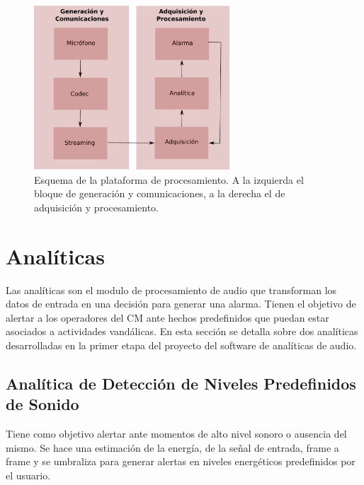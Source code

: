 \documentclass{article}
\begin{document}
\begin{figure}[h]
\begin{center}
\includegraphics[width=0.65\textwidth]{plataforma_procesamiento} 
\caption{Esquema de la plataforma de procesamiento. A la izquierda el bloque de generación y comunicaciones, a la derecha el de adquisición y procesamiento.}
\label{fig:plataforma_procesamiento}
\end{center}
\end{figure}


\section{Analíticas}
\label{analiticas}
Las analíticas son el modulo de procesamiento de audio que transforman los datos de entrada en una decisión para generar una alarma. Tienen el objetivo de alertar a los operadores del CM ante hechos predefinidos que puedan estar asociados a actividades vandálicas. En esta sección se detalla sobre dos analíticas desarrolladas en la primer etapa del proyecto del software de analíticas de audio. 

\subsection{Analítica de Detección de Niveles Predefinidos de Sonido}
Tiene como objetivo alertar ante momentos de alto nivel sonoro o ausencia del mismo. Se hace una estimación de la energía, de la señal de entrada, frame a frame y se umbraliza para generar alertas en niveles energéticos predefinidos por el usuario.
\end{document}
